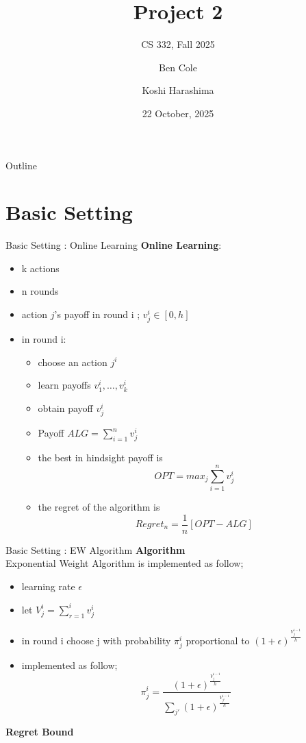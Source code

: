 \documentclass{beamer}
\title[Project 2]{Project 2}
\subtitle{CS 332, Fall 2025}
\author{Ben Cole \and Koshi Harashima}
\date{22 October, 2025}
\begin{document}
\maketitle

\begin{frame}{Outline}
  \tableofcontents
\end{frame}

\section{Basic Setting}

\begin{frame}{Basic Setting : Online Learning}
    \textbf{Online Learning}: 
    \begin{itemize}
        \item k actions
        \item n rounds
        \item action $j$'s payoff in round i ; $v_j^i \in [0,h]$
        \item in round i:
        \begin{itemize}
            \item choose an action $j^i$
            \item learn payoffs $v_1^i, \dots, v_k^i$
            \item obtain payoff $v_j^i$
        \item Payoff $ALG = \sum_{i = 1} ^n v_j^i$
        \item the best in hindsight payoff is 
        \[
        OPT = max_j \sum_{i = 1} ^n v_j^i
        \]
        \item the regret of the algorithm is 
        \[
        Regret_n = \frac{1}{n}[OPT - ALG]
        \]
        \end{itemize}   
    \end{itemize}
\end{frame}

\begin{frame}{Basic Setting : EW Algorithm}
    \textbf{Algorithm}\\
    Exponential Weight Algorithm is implemented as follow; 
    \begin{itemize}
        \item learning rate $\epsilon$
        \item let $V_j^i = \sum_{r = 1}^i v_j^i$
        \item in round i choose j with probability $\pi_j^i$ proportional to $(1+\epsilon)^{\frac{V_j^{i-1}}{h}}$
        \item implemented as follow;
        {\small
        \[
            \pi_j^i = \frac{(1+\epsilon)^{\frac{V_j^{i-1}}{h}}}{\sum_{j'}(1+\epsilon)^{\frac{V_{j'}^{i-1}}{h}}}
        \]}
    \end{itemize}
    \textbf{Regret Bound}
    
    

\end{frame}
\end{document}
